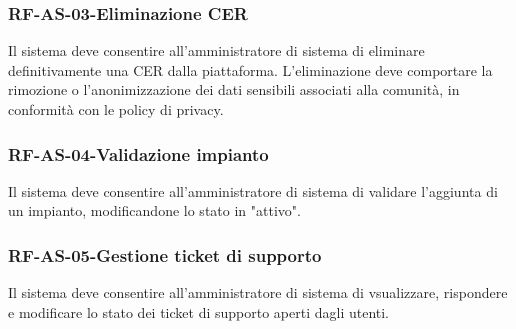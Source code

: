 \subsubsection*{RF-AS-03-Eliminazione CER}
Il sistema deve consentire all'amministratore di sistema di eliminare definitivamente una CER dalla piattaforma. L'eliminazione deve comportare la rimozione o l'anonimizzazione dei dati sensibili associati alla comunità, in conformità con le policy di privacy.

\subsubsection*{RF-AS-04-Validazione impianto}
Il sistema deve consentire all'amministratore di sistema di validare l'aggiunta di un impianto, modificandone lo stato in "attivo".

\subsubsection*{RF-AS-05-Gestione ticket di supporto}
Il sistema deve consentire all'amministratore di sistema di vsualizzare, rispondere e modificare lo stato dei ticket di supporto aperti dagli utenti.